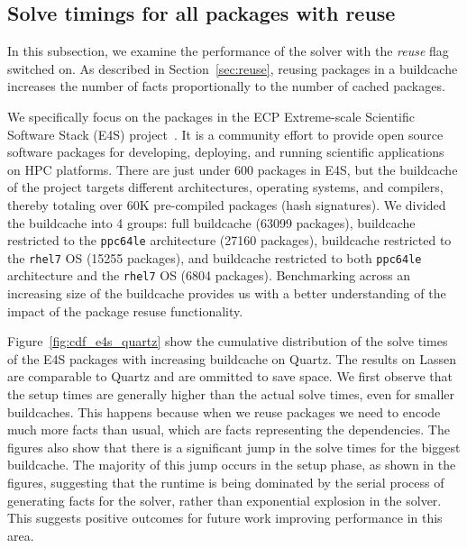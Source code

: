 
\subsection{Solve timings for all packages with reuse}

In this subsection, we examine the performance of the solver with the \emph{reuse} flag switched on. As described in Section~\ref{sec:reuse}, reusing packages in a buildcache increases the number of facts proportionally to the number of cached packages.



% 

We specifically focus on the packages in the ECP Extreme-scale Scientific Software Stack (E4S) project~\cite{e4s}. It is a community effort to provide open source software packages for developing, deploying, and running scientific applications on HPC platforms. There are just under 600 packages in E4S, but the buildcache of the project targets different architectures, operating systems, and compilers, thereby totaling over 60K pre-compiled packages (hash signatures). We divided the buildcache into 4 groups: full buildcache (63099 packages), buildcache restricted to the \texttt{ppc64le} architecture (27160 packages), buildcache restricted to the \texttt{rhel7} OS (15255 packages), and buildcache restricted to both \texttt{ppc64le} architecture and the \texttt{rhel7} OS (6804 packages). Benchmarking across an increasing size of the buildcache provides us with a better understanding of the impact of the package resuse functionality.

Figure~\ref{fig:cdf_e4s_quartz} show the cumulative distribution of the solve times of the E4S packages with increasing buildcache on Quartz. The results on Lassen are comparable to Quartz and are ommitted to save space. We first observe that the setup times are generally higher than the actual solve times, even for smaller buildcaches. This happens because when we reuse packages we need to encode much more facts than usual, which are facts representing the dependencies. The figures also show that there is a significant jump in the solve times for the biggest buildcache. The majority of this jump occurs in the setup phase, as shown in the figures, suggesting that the runtime is being dominated by the serial process of generating facts for the solver, rather than exponential explosion in the solver. This suggests positive outcomes for future work improving performance in this area.
